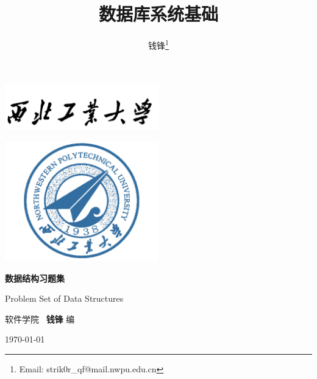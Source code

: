 \documentclass[10pt,UTF8]{book} %
\title{数据库系统基础}
\author{钱锋\thanks{Email: strik0r\_qf@mail.nwpu.edu.cn}}
\begin{document}


\begin{titlepage}
    \thispagestyle{empty}
    \centering
        \vspace*{3cm}
        \includegraphics[width=0.5\textwidth]{pic/npu_2.png}\par
        \vspace{1em}
        \includegraphics[width=0.5\textwidth]{pic/npu_1.png}\par
    \vspace*{1em}
        \begin{center}
            \Huge \heiti \textbf{数据结构习题集}

            Problem Set of Data Structures
        \end{center}

        \vspace{14em}
        \begin{center}
        \songti

        \kaishu 软件学院 \, \heiti\textbf{钱锋} \quad \songti 编
        \vspace{0.5em}

    \today
    \end{center}
\end{titlepage}

\frontmatter
\newpage
\pagestyle{plain}
\makeatother

\pagestyle{plain}
{\tableofcontents}
\newpage
\thispagestyle{empty}
\cleardoublepage %


\makeatletter
\let\ps@plain\ps@empty
\makeatother
\end{document}
